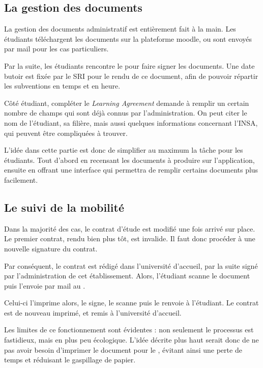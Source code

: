		\subsection{La gestion  des documents}
		La gestion des documents administratif est entièrement fait à la main. Les étudiants téléchargent les documents sur la plateforme moodle, ou sont envoyés par mail pour les cas particuliers. 
                
                Par la suite, les étudiants rencontre le \ri pour faire signer les documents. Une date butoir est fixée par le SRI pour le rendu de ce document, afin de pouvoir répartir les subventions en temps et en heure. 

\medbreak

Côté étudiant, compléter le \textit{Learning Agreement} demande à remplir un certain nombre de champs qui sont déjà connus par l'administration. On peut citer le nom de l'étudiant, sa filière, mais aussi quelques informations concernant l'INSA, qui peuvent être compliquées à trouver. 

\medbreak

L'idée dans cette partie est donc de simplifier au maximum la tâche pour les étudiants. Tout d'abord en recensant les documents à produire sur l'application, ensuite en offrant une interface qui permettra de remplir certains documents plus facilement. 

\subsection{Le suivi de la mobilité}

Dans la majorité des cas, le contrat d'étude est modifié une fois arrivé sur place. Le premier contrat, rendu bien plus tôt, est invalide. Il faut donc procéder à une nouvelle signature du contrat. 

Par conséquent, le contrat est rédigé dans l'université d'accueil, par la suite  signé par l'administration de cet établissement. Alors, l'étudiant scanne  le document puis l'envoie par mail au \ri. 

Celui-ci l'imprime alors, le signe, le scanne puis le renvoie à l'étudiant. Le contrat est  de nouveau imprimé, et remis à l'université d'accueil. 

\medbreak

Les limites de ce fonctionnement sont évidentes : non seulement le processus est fastidieux, mais en plus peu écologique. L'idée décrite plus haut serait donc de ne pas avoir besoin d'imprimer le document pour le \ri, évitant ainsi une perte de temps et réduisant le gaspillage de papier. 

